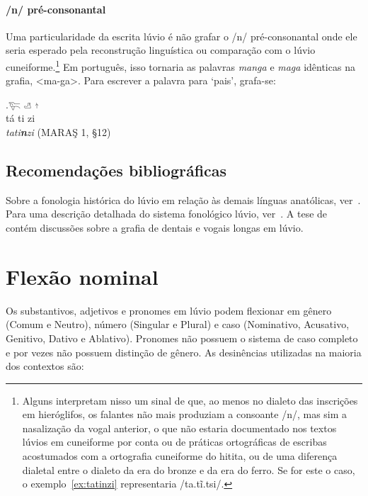 \paragraph{/n/ pré\hyp{}consonantal}
Uma particularidade da escrita lúvio é não grafar o /n/
pré\hyp{}consonantal onde ele seria esperado pela reconstrução linguística ou
comparação com o lúvio cuneiforme.\footnote{%
	Alguns interpretam nisso um sinal de que, ao menos no dialeto das inscrições
	em hieróglifos, os falantes não mais produziam a consoante /n/, mas sim
	a nasalização da vogal anterior, o que não estaria documentado nos textos
	lúvios em cuneiforme por conta ou de práticas ortográficas de escribas
	acostumados com a ortografia cuneiforme do hitita, ou de uma diferença
	dialetal entre o dialeto da era do bronze e da era do ferro. Se for este o
	caso, o exemplo~\ref{ex:tatinzi} representaria /ta.tĩ.tsi/.}
Em português, isso tornaria as palavras \emph{manga} e \emph{maga} idênticas na
grafia, <ma-ga>.
Para escrever a palavra para `pais', grafa-se:

\exg.\label{ex:tatinzi}\Large 𔐞 \Large 𔑣 \Large 𔖩\\
tá ti zi\\
\emph{tati\textbf{n}zi}  (MARAŞ 1, §12)



\subsection{Recomendações bibliográficas}

Sobre a fonologia histórica do lúvio em relação às demais línguas anatólicas,
ver~\citet[p. 229ff.]{Melchert1994}.
Para uma descrição detalhada do sistema fonológico lúvio,
ver~\citet[p. 177ff.]{MelchertLanguage}.
A tese de~\citet{Vertegaal2020} contém discussões sobre a grafia de dentais e
vogais longas em lúvio.

\section{Flexão nominal}

Os substantivos, adjetivos e pronomes em lúvio podem flexionar em gênero (Comum e Neutro),
número (Singular e Plural) e caso (Nominativo, Acusativo, Genitivo, Dativo e
Ablativo).
Pronomes não possuem o sistema de caso completo e por vezes não possuem
distinção de gênero.
As desinências utilizadas na maioria dos contextos são:


